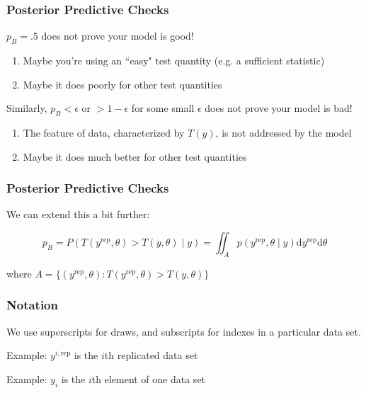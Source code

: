 \documentclass{beamer}
\begin{document}
\begin{frame}
\frametitle{Posterior Predictive Checks}

$p_B = .5$ does not \*prove\* your model is good! 
\begin{enumerate}
\item Maybe you're using an ``easy" test quantity (e.g. a sufficient statistic)
\item Maybe it does poorly for other test quantities
\end{enumerate}

Similarly, $p_B < \epsilon$ or $> 1 - \epsilon$ for some
small $\epsilon$ does not \*prove\* your model is bad!
\begin{enumerate}
\item The feature of data, characterized by $T(y)$, is not addressed
  by the model
\item Maybe it does much better for other test quantities
\end{enumerate}


\end{frame}


\begin{frame}
\frametitle{Posterior Predictive Checks}

We can extend this a bit further:

\[
p_B = P(T(y^{\text{rep}}, \theta) > T(y, \theta) \mid y) = \iint_{A} p(y^{\text{rep}}, \theta \mid y) \text{d} y^{\text{rep}}\text{d} \theta
\]

where $A = \{(y^{\text{rep}}, \theta) : T(y^{\text{rep}}, \theta) > T(y, \theta) \}$

\end{frame}



\begin{frame}
\frametitle{Notation}

We use superscripts for draws, and subscripts for indexes in a particular data set.
\newline

Example: $y^{i,\text{rep}}$ is the $i$th replicated data set
\newline

Example: $y_i$ is the $i$th element of one data set

\end{frame}
\end{document}
